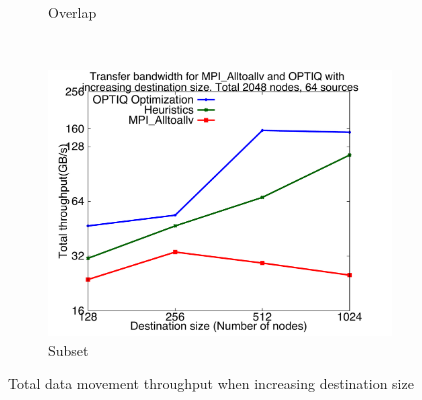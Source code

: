 \begin{figure}
\begin{subfigure}[b]{0.32\textwidth}
                \caption{Overlap}
                \label{fig:incrsize_overlap}
        \end{subfigure}
        ~ %
        \begin{subfigure}[b]{0.32\textwidth}
                \includegraphics[width=\textwidth]{figures/incrsize_subset}
                \caption{Subset}
                \label{fig:incrsize_subset}
        \end{subfigure}
        \caption{Total data movement throughput when increasing destination size}
        \label{fig:incrsize}
\end{figure}

